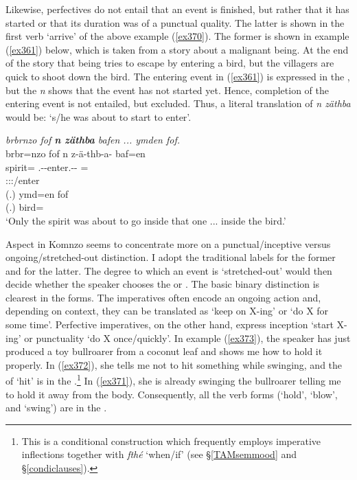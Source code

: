 Likewise, perfectives do not entail that an event is finished, but rather that it has started or that its duration was of a punctual quality. The latter is shown in the first verb `arrive' of the above example (\ref{ex370}). The former is shown in example (\ref{ex361}) below, which is taken from a story about a malignant being. At the end of the story that being tries to escape by entering a bird, but the villagers are quick to shoot down the bird. The entering event in (\ref{ex361}) is expressed in the , but the   \emph{n} shows that the event has not started yet. Hence, completion of the entering event is not entailed, but excluded. Thus, a literal translation of \emph{n zäthba} would be: `s/he was about to start to enter'.

\begin{exe}
	\ex \emph{brbrnzo fof \textbf{n zäthba} bafen ... ymden fof.}\\
	\glll brbr=nzo fof n z-ä-thb-a-\Zero{} baf=en \\
	spirit=\Only{} \Emph{} \Imn{} \Med.\Gam-\Ndu-enter.\Rs-\Pst-\Stsg{} \Recog=\Loc{}\\
	{} {} {} \footnotesize{\Stsg:\Sbj:\Pst:\Pfv/enter} {}\\
	\sn
	\gll (.) ymd=en fof\\
	(.) bird=\Loc{} \Emph{}\\
	\trans `Only the spirit was about to go inside that one ... inside the bird.'\\ 
	\label{ex361}
\end{exe}

Aspect in Komnzo seems to concentrate more on a punctual/inceptive versus ongoing/{\linebreak}stretched-out distinction. I adopt the traditional labels  for the former and  for the latter. The degree to which an event is `stretched-out' would then decide whether the speaker chooses the  or  . The basic binary distinction is clearest in the  forms. The  imperatives often encode an ongoing action and, depending on context, they can be translated as `keep on X-ing' or `do X for some time'. Perfective imperatives, on the other hand, express inception `start X-ing' or punctuality `do X once/quickly'. In example (\ref{ex373}), the speaker has just produced a toy bullroarer from a coconut leaf and shows me how to hold it properly. In (\ref{ex372}), she tells me not to hit something while swinging, and the  of `hit' is in the .\footnote{This is a conditional construction which frequently employs imperative inflections together with \emph{fthé} `when/if' (see \S{}\ref{TAMsemmood} and \S\ref{condiclauses}).} In (\ref{ex371}), she is already swinging the bullroarer telling me to hold it away from the body. Consequently, all the  verb forms (`hold', `blow', and `swing') are in the .

